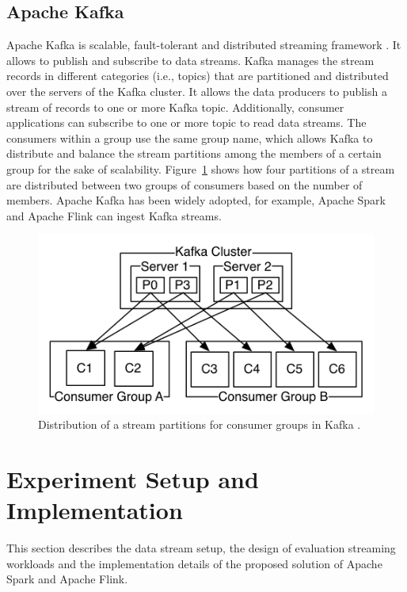 \documentclass[]{article}
\begin{document}
\subsection{Apache Kafka}
\par Apache Kafka is scalable, fault-tolerant and distributed streaming framework \cite{kafka}. It allows to publish and subscribe to data streams.
Kafka manages the stream records in different categories (i.e., topics) that are partitioned and distributed over the servers of the Kafka cluster. It allows the data producers to publish a stream of records to one or more  Kafka topic. Additionally, consumer applications can subscribe to one or more topic to read data streams. The consumers within a group use the  same group name, which allows Kafka to distribute and balance the stream partitions among the  members of a certain group for the sake of scalability. Figure~\ref{fig:kafka} shows how four partitions of a stream are distributed between two groups of consumers based on the number of members. 
Apache Kafka has been widely  adopted, for example, 
Apache Spark and Apache Flink can ingest Kafka streams. 

\begin{figure}[h]
 
  \centering
    \includegraphics[width=\textwidth, height=.4\textheight]{kafka_groups.png}
     \caption{ Distribution of a stream partitions for consumer groups in Kafka \cite{kafka}.}
     \label{fig:kafka}
\end{figure} 

\newpage
\section{Experiment Setup and Implementation}
\label{sec:sec3}
This section describes the data stream setup, the design of evaluation streaming workloads and the  implementation details of the proposed solution of Apache Spark and Apache Flink.
\end{document}
